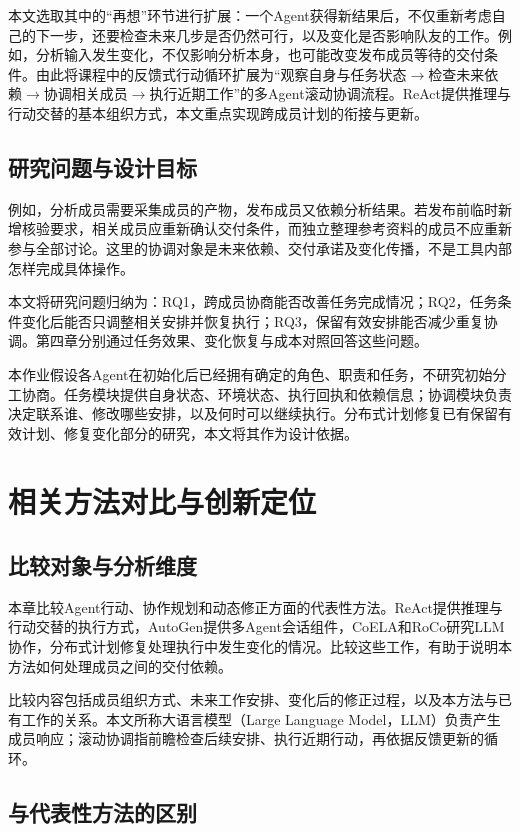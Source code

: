 本文选取其中的“再想”环节进行扩展：一个Agent获得新结果后，不仅重新考虑自己的下一步，还要检查未来几步是否仍然可行，以及变化是否影响队友的工作。例如，分析输入发生变化，不仅影响分析本身，也可能改变发布成员等待的交付条件。由此将课程中的反馈式行动循环扩展为“观察自身与任务状态$\rightarrow$检查未来依赖$\rightarrow$协调相关成员$\rightarrow$执行近期工作”的多Agent滚动协调流程。ReAct提供推理与行动交替的基本组织方式\cite{react}，本文重点实现跨成员计划的衔接与更新。

\section{研究问题与设计目标}

例如，分析成员需要采集成员的产物，发布成员又依赖分析结果。若发布前临时新增核验要求，相关成员应重新确认交付条件，而独立整理参考资料的成员不应重新参与全部讨论。这里的协调对象是未来依赖、交付承诺及变化传播，不是工具内部怎样完成具体操作。

本文将研究问题归纳为：RQ1，跨成员协商能否改善任务完成情况；RQ2，任务条件变化后能否只调整相关安排并恢复执行；RQ3，保留有效安排能否减少重复协调。第四章分别通过任务效果、变化恢复与成本对照回答这些问题。

本作业假设各Agent在初始化后已经拥有确定的角色、职责和任务，不研究初始分工协商。任务模块提供自身状态、环境状态、执行回执和依赖信息；协调模块负责决定联系谁、修改哪些安排，以及何时可以继续执行。分布式计划修复已有保留有效计划、修复变化部分的研究\cite{repair}，本文将其作为设计依据。

\chapter{相关方法对比与创新定位}
\label{chap:comparison}

\section{比较对象与分析维度}

本章比较Agent行动、协作规划和动态修正方面的代表性方法。ReAct提供推理与行动交替的执行方式，AutoGen提供多Agent会话组件，CoELA和RoCo研究LLM协作，分布式计划修复处理执行中发生变化的情况。比较这些工作，有助于说明本方法如何处理成员之间的交付依赖。

比较内容包括成员组织方式、未来工作安排、变化后的修正过程，以及本方法与已有工作的关系。本文所称大语言模型（Large Language Model，LLM）负责产生成员响应；滚动协调指前瞻检查后续安排、执行近期行动，再依据反馈更新的循环。

\section{与代表性方法的区别}

